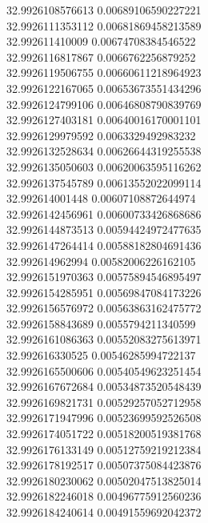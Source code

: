 {32.9926108576613	0.00689106590227221\\
32.9926111353112	0.00681869458213589\\
32.992611410009	0.00674708384546522\\
32.9926116817867	0.0066762256879252\\
32.9926119506755	0.00660611218964923\\
32.9926122167065	0.00653673551434296\\
32.9926124799106	0.00646808790839769\\
32.9926127403181	0.00640016170001101\\
32.9926129979592	0.0063329492983232\\
32.9926132528634	0.00626644319255538\\
32.9926135050603	0.00620063595116262\\
32.9926137545789	0.00613552022099114\\
32.992614001448	0.00607108872644974\\
32.9926142456961	0.00600733426868686\\
32.9926144873513	0.00594424972477635\\
32.9926147264414	0.00588182804691436\\
32.992614962994	0.00582006226162105\\
32.9926151970363	0.00575894546895497\\
32.9926154285951	0.00569847084173226\\
32.9926156576972	0.00563863162475772\\
32.9926158843689	0.0055794211340599\\
32.9926161086363	0.00552083275613971\\
32.992616330525	0.00546285994722137\\
32.9926165500606	0.00540549623251454\\
32.9926167672684	0.00534873520548439\\
32.9926169821731	0.00529257052712958\\
32.9926171947996	0.00523699592526508\\
32.9926174051722	0.00518200519381768\\
32.9926176133149	0.00512759219212384\\
32.9926178192517	0.00507375084423876\\
32.9926180230062	0.00502047513825014\\
32.9926182246018	0.00496775912560236\\
32.9926184240614	0.00491559692042372\\
}
